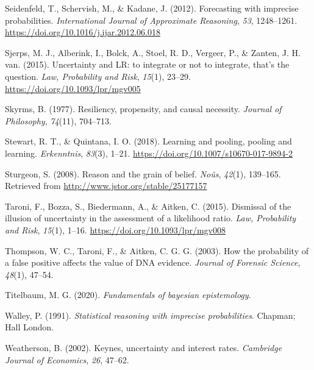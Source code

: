 \documentclass[
  10pt,
  dvipsnames,enabledeprecatedfontcommands]{scrartcl}
\newlength{\cslhangindent}
\newlength{\cslentryspacingunit} %
\newenvironment{CSLReferences}[2] %
 {%
  \setlength{\parindent}{0pt}
  \ifodd #1
  \let\oldpar\par
  \def\par{\hangindent=\cslhangindent\oldpar}
  \fi
  \setlength{\parskip}{#2\cslentryspacingunit}
 }%
 {}
\begin{document}
\begin{CSLReferences}{1}{0}
\leavevmode{}%
Seidenfeld, T., Schervish, M., \& Kadane, J. (2012). Forecasting with
imprecise probabilities. \emph{International Journal of Approximate
Reasoning}, \emph{53}, 1248--1261.
\url{https://doi.org/10.1016/j.ijar.2012.06.018}

\leavevmode{}%
Sjerps, M. J., Alberink, I., Bolck, A., Stoel, R. D., Vergeer, P., \&
Zanten, J. H. van. (2015). {Uncertainty and LR: to integrate or not to
integrate, that's the question}. \emph{Law, Probability and Risk},
\emph{15}(1), 23--29. \url{https://doi.org/10.1093/lpr/mgv005}

\leavevmode{}%
Skyrms, B. (1977). Resiliency, propensity, and causal necessity.
\emph{Journal of Philosophy}, \emph{74}(11), 704--713.

\leavevmode{}%
Stewart, R. T., \& Quintana, I. O. (2018). Learning and pooling, pooling
and learning. \emph{Erkenntnis}, \emph{83}(3), 1--21.
\url{https://doi.org/10.1007/s10670-017-9894-2}

\leavevmode{}%
Sturgeon, S. (2008). Reason and the grain of belief. \emph{No{û}s},
\emph{42}(1), 139--165. Retrieved from
\url{http://www.jstor.org/stable/25177157}

\leavevmode{}%
Taroni, F., Bozza, S., Biedermann, A., \& Aitken, C. (2015). {Dismissal
of the illusion of uncertainty in the assessment of a likelihood ratio}.
\emph{Law, Probability and Risk}, \emph{15}(1), 1--16.
\url{https://doi.org/10.1093/lpr/mgv008}

\leavevmode{}%
Thompson, W. C., Taroni, F., \& Aitken, C. G. G. (2003). How the
probability of a false positive affects the value of {DNA} evidence.
\emph{Journal of Forensic Science}, \emph{48}(1), 47--54.

\leavevmode{}%
Titelbaum, M. G. (2020). \emph{Fundamentals of bayesian epistemology}.

\leavevmode{}%
Walley, P. (1991). \emph{Statistical reasoning with imprecise
probabilities}. Chapman; Hall London.

\leavevmode{}%
Weatherson, B. (2002). Keynes, uncertainty and interest rates.
\emph{Cambridge Journal of Economics}, \emph{26}, 47--62.

\end{CSLReferences}
\end{document}
